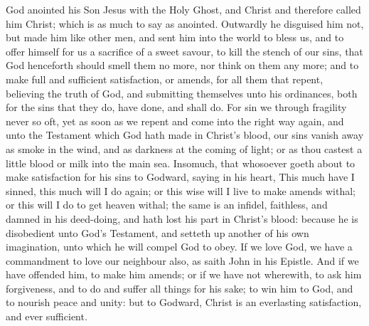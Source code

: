 God anointed his Son Jesus with the Holy Ghost, and Christ and 
therefore called him Christ; which is as much to say as 
anointed. Outwardly he disguised him not, but made 
him like other men, and sent him into the world to bless 
us, and to offer himself for us a sacrifice of a sweet savour, 
to kill the stench of our sins, that God henceforth should 
smell them no more, nor think on them any more; and to 
make full and sufficient satisfaction, or amends, for all 
them that repent, believing the truth of God, and submitting
themselves unto his ordinances, both for the sins 
that they do, have done, and shall do. For sin we through 
fragility never so oft, yet as soon as we repent and come 
into the right way again, and unto the Testament which 
God hath made in Christ's blood, our sins vanish away 
as smoke in the wind, and as darkness at the coming of 
light; or as thou castest a little blood or milk into the main 
sea. Insomuch, that whosoever goeth about to make 
satisfaction for his sins to Godward, saying in his heart, 
This much have I sinned, this much will I do again; or 
this wise will I live to make amends withal; or this will I 
do to get heaven withal; the same is an infidel, faithless, 
and damned in his deed-doing, and hath lost his part in 
Christ's blood: because he is disobedient unto God's 
Testament, and setteth up another of his own imagination,
unto which he will compel God to obey. If we 
love God, we have a commandment to love our neighbour 
also, as saith John in his Epistle. And if we have offended 
him, to make him amends; or if we have not wherewith, 
to ask him forgiveness, and to do and suffer all things for 
his sake; to win him to God, and to nourish peace and 
unity: but to Godward, Christ is an everlasting satisfaction,
and ever sufficient. 

